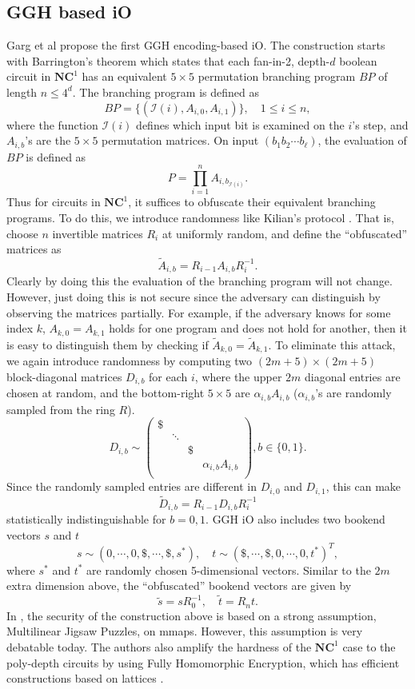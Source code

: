 \documentclass[10pt]{article}
\newcommand{\set}[1]{\mathcal{#1}}
\theoremstyle{plain}
\theoremstyle{definition}
\theoremstyle{remark}
\newcommand{\bits}{\{0,1\}}
\newcommand{\inp}{\set{I}}
\begin{document}
\subsection{GGH based iO}
Garg et al \cite{GGH13b} propose the first GGH encoding-based iO. The construction starts with Barrington's theorem \cite{Bar86} which states that each fan-in-2, depth-$d$ boolean circuit in $\mathbf{NC}^1$ has an equivalent $5\times 5$ permutation branching program $BP$ of length $n \leq 4^d$. The branching program is defined as
$$BP = \{(\inp(i), A_{i,0}, A_{i,1})\},\quad 1\leq i \leq n,$$
where the function $\inp(i)$ defines which input bit is examined on the $i$'s step, and $A_{i,b}$'s are the $5\times 5$ permutation matrices. On input $(b_1b_2\cdots b_\ell)$, the evaluation of $BP$ is defined as
$$P = \prod_{i=1}^n A_{i,b_{\inp(i)}}.$$ 
Thus for circuits in $\mathbf{NC}^1$, it suffices to obfuscate their equivalent branching programs. To do this, we introduce randomness like Kilian's protocol \cite{Kil88}. That is, choose $n$ invertible matrices $R_i$ at uniformly random, and define the ``obfuscated'' matrices as
$$\tilde{A}_{i,b} = R_{i-1} A_{i,b} R_i^{-1}.$$
Clearly by doing this the evaluation of the branching program will not change. However, just doing this is not secure since the adversary can distinguish by observing the matrices partially. For example, if the adversary knows for some index $k$, $A_{k,0} = A_{k,1}$ holds for one program and does not hold for another, then it is easy to distinguish them by checking if $\tilde{A}_{k,0} = \tilde{A}_{k,1}$. To eliminate this attack, we again introduce randomness by computing two $(2m+5) \times (2m+5)$ block-diagonal matrices $D_{i,b}$ for each $i$, where the upper $2m$ diagonal entries are chosen at random, and the bottom-right $5\times 5$ are $\alpha_{i,b} A_{i,b}$ ($\alpha_{i,b}$'s are randomly sampled from the ring $R$).
$$D_{i,b} \sim \begin{pmatrix}
\$ & & & \\
& \ddots & & \\
& & \$ & \\
& & & \alpha_{i,b} A_{i,b} \\
\end{pmatrix}, b \in \bits.$$ 
Since the randomly sampled entries are different in $D_{i,0}$ and $D_{i,1}$, this can make 
$$\tilde{D}_{i,b} = R_{i-1} D_{i,b} R_i^{-1}$$
statistically indistinguishable for $b = 0,1$. GGH iO also includes two bookend vectors $s$ and $t$
$$s \sim (0, \cdots, 0, \$, \cdots, \$, s^*), \quad t \sim (\$, \cdots, \$, 0, \cdots, 0, t^*)^T,$$
where $s^*$ and $t^*$ are randomly chosen 5-dimensional vectors. Similar to the $2m$ extra dimension above, the ``obfuscated'' bookend vectors are given by
$$\tilde{s} = sR_0^{-1}, \quad \tilde{t} = R_n t.$$
In \cite{GGH13b}, the security of the construction above is based on a strong assumption, Multilinear Jigsaw Puzzles, on mmaps. However, this assumption is very debatable today. The authors also amplify the hardness of the $\mathbf{NC}^1$ case to the poly-depth circuits by using Fully Homomorphic Encryption, which has efficient constructions based on lattices \cite{BV14, GSW13}.
\end{document}
